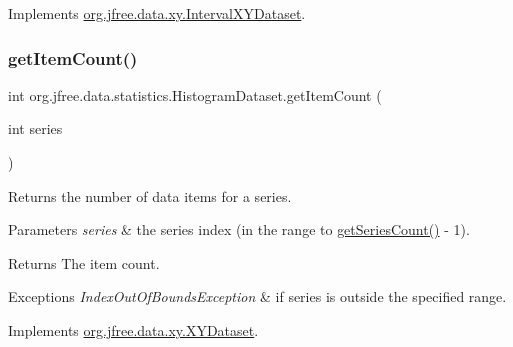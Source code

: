 Implements \mbox{\hyperlink{interfaceorg_1_1jfree_1_1data_1_1xy_1_1_interval_x_y_dataset_ae938af574bad07e7f47a8b423223ef9b}{org.\+jfree.\+data.\+xy.\+Interval\+X\+Y\+Dataset}}.

\mbox{\label{classorg_1_1jfree_1_1data_1_1statistics_1_1_histogram_dataset_a09cac32858b5274bcfe7b8070a52d5e5}} 
\subsubsection{\texorpdfstring{get\+Item\+Count()}{getItemCount()}}
{\footnotesize\ttfamily int org.\+jfree.\+data.\+statistics.\+Histogram\+Dataset.\+get\+Item\+Count (\begin{DoxyParamCaption}\item[{int}]{series }\end{DoxyParamCaption})}

Returns the number of data items for a series.


\begin{DoxyParams}{Parameters}
{\em series} & the series index (in the range {} to {\ttfamily \mbox{\hyperlink{classorg_1_1jfree_1_1data_1_1statistics_1_1_histogram_dataset_a6dd14ceca0cb3f9b3d666a2aec480f8d}{get\+Series\+Count()}} -\/ 1}).\\
\hline
\end{DoxyParams}
\begin{DoxyReturn}{Returns}
The item count.
\end{DoxyReturn}

\begin{DoxyExceptions}{Exceptions}
{\em Index\+Out\+Of\+Bounds\+Exception} & if {\ttfamily series} is outside the specified range. \\
\hline
\end{DoxyExceptions}


Implements \mbox{\hyperlink{interfaceorg_1_1jfree_1_1data_1_1xy_1_1_x_y_dataset_ae81f9de91dfcae45028fc8a486a119da}{org.\+jfree.\+data.\+xy.\+X\+Y\+Dataset}}.

\mbox{\label{classorg_1_1jfree_1_1data_1_1statistics_1_1_histogram_dataset_a6dd14ceca0cb3f9b3d666a2aec480f8d}} 
